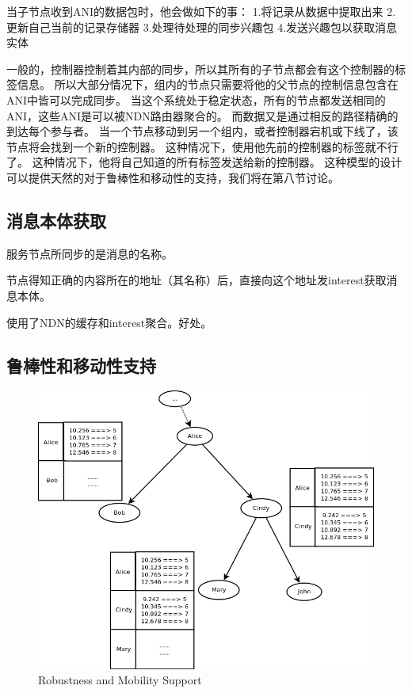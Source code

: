 \documentclass[a4paper]{article}
\begin{document}
当子节点收到ANI的数据包时，他会做如下的事：
1.将记录从数据中提取出来
2.更新自己当前的记录存储器
3.处理待处理的同步兴趣包
4.发送兴趣包以获取消息实体

一般的，控制器控制着其内部的同步，所以其所有的子节点都会有这个控制器的标签信息。
所以大部分情况下，组内的节点只需要将他的父节点的控制信息包含在ANI中皆可以完成同步。
当这个系统处于稳定状态，所有的节点都发送相同的ANI，这些ANI是可以被NDN路由器聚合的。
而数据又是通过相反的路径精确的到达每个参与者。
当一个节点移动到另一个组内，或者控制器宕机或下线了，该节点将会找到一个新的控制器。
这种情况下，使用他先前的控制器的标签就不行了。
这种情况下，他将自己知道的所有标签发送给新的控制器。
这种模型的设计可以提供天然的对于鲁棒性和移动性的支持，我们将在第八节讨论。

\subsection{消息本体获取}

服务节点所同步的是消息的名称。

节点得知正确的内容所在的地址（其名称）后，直接向这个地址发interest获取消息本体。

使用了NDN的缓存和interest聚合。好处。

\subsection{鲁棒性和移动性支持}

\begin{figure}[!t]
\centering
\includegraphics[width=4.5in]{../png/mobility.png}
\caption{Robustness and Mobility Support}
\label{mobility_pic}
\end{figure}
\end{document}

